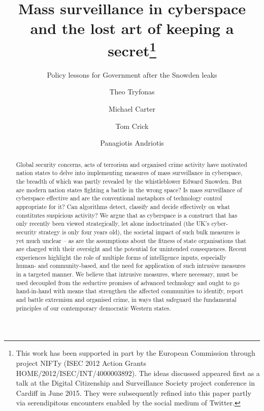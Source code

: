 \documentclass{llncs}
\begin{document}
\title{Mass surveillance in cyberspace and the lost art of keeping a secret\thanks{This work has been supported in part by the European Commission through project NIFTy (ISEC 2012 Action Grants HOME/2012/ISEC/INT/4000003892). The ideas discussed appeared first as a talk at the Digital Citizenship and Surveillance Society project conference in Cardiff in June 2015. They were subsequently refined into this paper partly via serendipitous encounters enabled by the social medium of Twitter.}}
\subtitle{Policy lessons for Government after the Snowden leaks}

\author{Theo Tryfonas \and Michael Carter \and Tom Crick \and Panagiotis Andriotis}

\maketitle

\begin{abstract}
Global security concerns, acts of terrorism and organised crime activity have motivated nation states to delve into implementing measures of mass surveillance in cyberspace, the breadth of which was partly revealed by the whistleblower Edward Snowden. But are modern nation states fighting a battle in the wrong space? Is mass surveillance of cyberspace effective and are the conventional metaphors of technology control appropriate for it? Can algorithms detect, classify and decide effectively on what constitutes suspicious activity? We argue that as cyberspace is a construct that has only recently been viewed strategically, let alone indoctrinated (the UK’s cyber-security strategy is only four years old), the societal impact of such bulk measures is yet much unclear -- as are the assumptions about the fitness of state organisations that are charged with their oversight and the potential for unintended consequences. Recent experiences highlight the role of multiple forms of intelligence inputs, especially human- and community-based, and the need for application of such intrusive measures in a targeted manner. We believe that intrusive measures, where necessary, must be used decoupled from the seductive promises of advanced technology and ought to go hand-in-hand with means that strengthen the affected communities to identify, report and battle extremism and organised crime, in ways that safeguard the fundamental principles of our contemporary democratic Western states.
\end{abstract}
\end{document}
